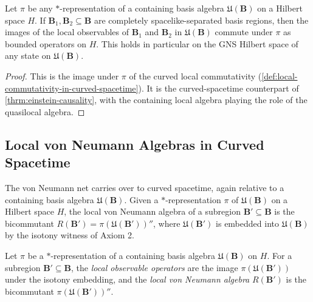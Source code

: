 \begin{theorem}
    \label{thrm:einstein-causality-in-curved-spacetime}
    \leanok
    Let $\pi$ be any $*$-representation of a containing basis algebra $\mathfrak{U}(\mathbf{B})$ on a Hilbert space $H$. If $\mathbf{B}_1, \mathbf{B}_2 \subseteq \mathbf{B}$ are completely spacelike-separated basis regions, then the images of the local observables of $\mathbf{B}_1$ and $\mathbf{B}_2$ in $\mathfrak{U}(\mathbf{B})$ commute under $\pi$ as bounded operators on $H$. This holds in particular on the GNS Hilbert space of any state on $\mathfrak{U}(\mathbf{B})$.
\end{theorem}
\begin{proof}
    \leanok
    This is the image under $\pi$ of the curved local commutativity (\ref{def:local-commutativity-in-curved-spacetime}). It is the curved-spacetime counterpart of \ref{thrm:einstein-causality}, with the containing local algebra playing the role of the quasilocal algebra.
\end{proof}

\subsection{Local von Neumann Algebras in Curved Spacetime}

The von Neumann net carries over to curved spacetime, again relative to a containing basis algebra $\mathfrak{U}(\mathbf{B})$. Given a $*$-representation $\pi$ of $\mathfrak{U}(\mathbf{B})$ on a Hilbert space $H$, the local von Neumann algebra of a subregion $\mathbf{B}' \subseteq \mathbf{B}$ is the bicommutant $R(\mathbf{B}') = \pi(\mathfrak{U}(\mathbf{B}'))''$, where $\mathfrak{U}(\mathbf{B}')$ is embedded into $\mathfrak{U}(\mathbf{B})$ by the isotony witness of Axiom 2.

\begin{definition}
    \label{def:local-von-neumann-in-curved-spacetime}
    \leanok
    Let $\pi$ be a $*$-representation of a containing basis algebra $\mathfrak{U}(\mathbf{B})$ on $H$. For a subregion $\mathbf{B}' \subseteq \mathbf{B}$, the \emph{local observable operators} are the image $\pi(\mathfrak{U}(\mathbf{B}'))$ under the isotony embedding, and the \emph{local von Neumann algebra} $R(\mathbf{B}')$ is the bicommutant $\pi(\mathfrak{U}(\mathbf{B}'))''$.
\end{definition}

